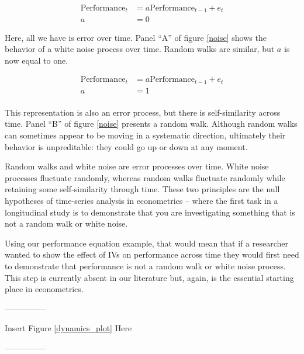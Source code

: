 \documentclass[english,,man]{apa6}
\theoremstyle{definition}
\theoremstyle{definition}
\theoremstyle{definition}
\theoremstyle{remark}
\begin{document}
\begin{equation}
\begin{split}
\label{whitenoise}
\textrm{Performance}_{t} &= a \textrm{Performance}_{t-1} + e_{t} \\
a &= 0
\end{split}
\end{equation}

\noindent Here, all we have is error over time. Panel \enquote{A} of
figure \ref{noise} shows the behavior of a white noise process over
time. Random walks are similar, but \(a\) is now equal to one.

\begin{equation}
\begin{split}
\label{rw}
\textrm{Performance}_{t} &= a \textrm{Performance}_{t-1} + e_{t} \\ 
a &= 1 \\ 
\end{split}
\end{equation}

\noindent This representation is also an error process, but there is
self-similarity across time. Panel \enquote{B} of figure \ref{noise}
presents a random walk. Although random walks can sometimes appear to be
moving in a systematic direction, ultimately their behavior is
unpreditable: they could go up or down at any moment.

Random walks and white noise are error processes over time. White noise
processes fluctuate randomly, whereas random walks fluctuate randomly
while retaining some self-similarity through time. These two principles
are the null hypotheses of time-series analysis in econometrics -- where
the first task in a longitudinal study is to demonstrate that you are
investigating something that is not a random walk or white noise.

Using our performance equation example, that would mean that if a
researcher wanted to show the effect of IVs on performance across time
they would first need to demonstrate that performance is not a random
walk or white noise process. This step is currently absent in our
literature but, again, is the essential starting place in econometrics.

\begin{center}

---------------

Insert Figure \ref{dynamics_plot} Here

---------------

\end{center}
\end{document}
